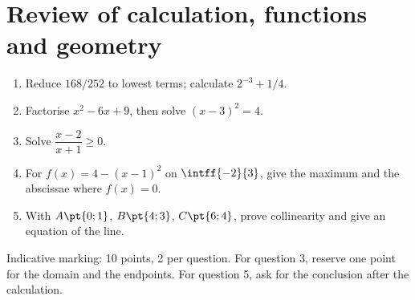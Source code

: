 \section{Review of calculation, functions and geometry}
\begin{example}\begin{enumerate}
\item Reduce $168/252$ to lowest terms; calculate $2^{-3}+1/4$.
\item Factorise $x^2-6x+9$, then solve $(x-3)^2=4$.
\item Solve $\dfrac{x-2}{x+1}\geq0$.
\item For $f(x)=4-(x-1)^2$ on $\intff{-2}{3}$, give the maximum and the abscissae where $f(x)=0$.
\item With $A\pt{0;1}$, $B\pt{4;3}$, $C\pt{6;4}$, prove collinearity and give an equation of the line.
\end{enumerate}\end{example}
\begin{teachernote}Indicative marking: 10 points, 2 per question. For question 3, reserve one point for the domain and the endpoints. For question 5, ask for the conclusion after the calculation.\end{teachernote}

